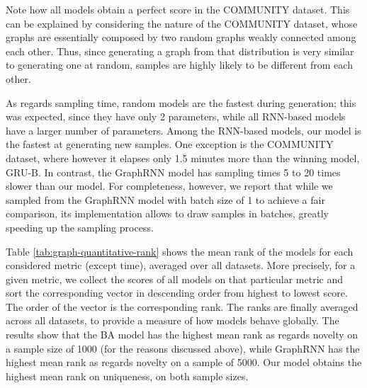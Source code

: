 Note how all models obtain a perfect score in the COMMUNITY dataset. This can be explained by considering the nature of the COMMUNITY dataset, whose graphs are essentially composed by two random graphs weakly connected among each other. Thus, since generating a graph from that distribution is very similar to generating one at random, samples are highly likely to be different from each other.

As regards sampling time, random models are the fastest during generation; this was expected, since they have only 2 parameters, while all RNN-based models have a larger number of parameters. Among the RNN-based models, our model is the fastest at generating new samples. One exception is the COMMUNITY dataset, where however it elapses only 1.5 minutes more than the winning model, GRU-B. In contrast, the GraphRNN model has sampling times 5 to 20 times slower than our model. For completeness, however, we report that while we sampled from the GraphRNN model with batch size of 1 to achieve a fair comparison, its implementation allows to draw samples in batches, greatly speeding up the sampling process.

Table \ref{tab:graph-quantitative-rank} shows the mean rank of the models for each considered metric (except time), averaged over all datasets. More precisely, for a given metric, we collect the scores of all models on that particular metric and sort the corresponding vector in descending order from highest to lowest score. The order of the vector is the corresponding rank. The ranks are finally averaged across all datasets, to provide a measure of how models behave globally. The results show that the BA model has the highest mean rank as regards novelty on a sample size of 1000 (for the reasons discussed above), while GraphRNN has the highest mean rank as regards novelty on a sample of 5000. Our model obtains the highest mean rank on uniqueness, on both sample sizes.


